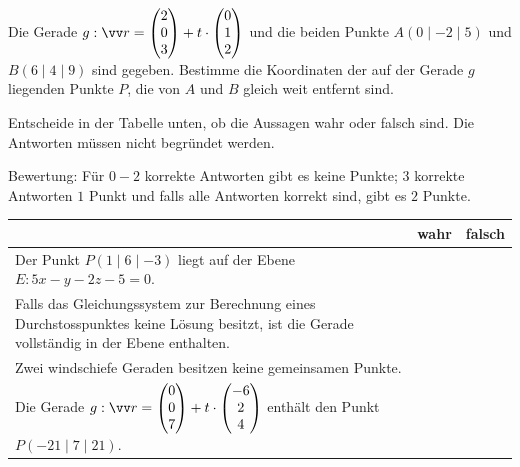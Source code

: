 \documentclass[11pt]{exam}
\begin{document}
\begin{questions}
\question[6] %
Die Gerade ${g:\v{r}=\Vec{2}{0}{3}+t\*\Vec{0}{1}{2}}$ und die beiden Punkte $A(0\mid-2\mid5)$ und $B(6\mid4\mid9)$ sind gegeben. Bestimme die Koordinaten der auf der Gerade $g$ liegenden Punkte $P$, die von $A$ und $B$ gleich weit entfernt sind.



\question[2]
Entscheide in der Tabelle unten, ob die Aussagen wahr oder falsch sind. Die Antworten müssen nicht begründet werden.\newline
\begin{small}
	Bewertung: Für $0-2$ korrekte Antworten gibt es keine Punkte; $3$ korrekte Antworten $1$ Punkt und falls alle Antworten korrekt sind, gibt es $2$ Punkte.
\end{small}
\begingroup
\renewcommand{\arraystretch}{1.5}
\begin{table}[H]
	\centering
	\begin{tabular}{|p{12cm}|c|c|}\hline
		& wahr & falsch \\\hline
		Der Punkt $P(1\mid 6\mid -3)$ liegt auf der Ebene $E:5x-y-2z-5=0$. & & \\\hline
		Falls das Gleichungssystem zur Berechnung eines Durchstosspunktes keine Lösung besitzt, ist die Gerade vollständig in der Ebene enthalten. & & \\\hline
		Zwei windschiefe Geraden besitzen keine gemeinsamen Punkte. & & \\\hline
		Die Gerade $g:\v{r}=\Vec{0}{0}{7}+t\*\Vec{-6}{2}{4}$ enthält den Punkt $P(-21\mid 7\mid 21)$. & & \\\hline
	\end{tabular}
\end{table}
\endgroup


\end{questions}
\end{document}
